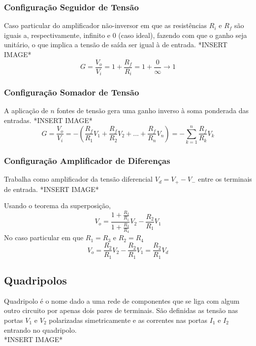 \documentclass{article}
\numberwithin{equation}{section}
\begin{document}
    \subsubsection{Configuração Seguidor de Tensão}
    Caso particular do amplificador não-inversor em que as resistências $R_{i}$ e $R_{f}$ são iguais a, respectivamente, infinito e $0$ (caso ideal), fazendo com que o ganho seja unitário, o que implica a tensão de saída ser igual à de entrada.
    *INSERT IMAGE*
    \begin{equation}
        G=\frac{V_{o}}{V_{i}}=1+\frac{R_{f}}{R_{i}}=1+\frac{0}{\infty}\xrightarrow{}1
    \end{equation}

    \subsubsection{Configuração Somador de Tensão}
    A aplicação de $n$ fontes de tensão gera uma ganho inverso à soma ponderada das entradas.
    *INSERT IMAGE*
    \begin{equation}
        G=\frac{V_{o}}{V_{i}}=-(\frac{R_{f}}{R_{1}}V_{1}+\frac{R_{f}}{R_{2}}V_{2}+...+\frac{R_{f}}{R_{n}}V_{n})=-\sum_{k=1}^{n}\frac{R_{f}}{R_{k}}V_{k}
    \end{equation}

    \subsubsection{Configuração Amplificador de Diferenças}
    Trabalha como amplificador da tensão diferencial $V_{d}=V_{+}-V_{-}$ entre os terminais de entrada. %
    *INSERT IMAGE*

    Usando o teorema da superposição,
    \begin{equation*}
        V_{o}=\frac{1+\displaystyle\frac{R_{2}}{R_{1}}}{1+\displaystyle\frac{R_{3}}{R_{4}}}V_{2} - \displaystyle\frac{R_{2}}{R_{1}}V_{1}
    \end{equation*}
    No caso particular em que $R_{1}=R_{3}$ e $R_{2}=R_{4}$
    \begin{equation}
        V_{o}=\frac{R_{2}}{R_{1}}V_{2}-\frac{R_{2}}{R_{1}}V_{1}=\frac{R_{2}}{R_{1}}V_{d}
    \end{equation}

    \subsection{Quadripolos}
    \label{subsec:quadripolos}
    Quadripolo é o nome dado a uma rede de componentes que se liga com algum outro circuito por apenas dois pares de terminais. São definidas as tensão nas portas $V_{1}$ e $V_{2}$ polarizadas simetricamente e as correntes nas portas $I_{1}$ e $I_{2}$ entrando no quadripolo. \\
    *INSERT IMAGE*
\end{document}

